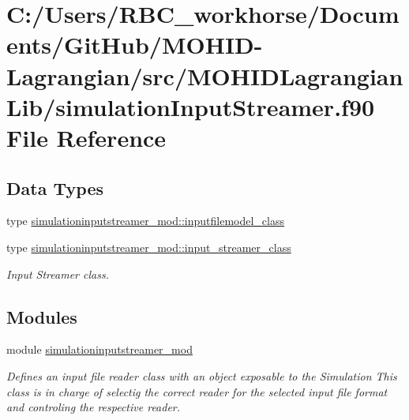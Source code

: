 \hypertarget{simulation_input_streamer_8f90}{}\section{C\+:/\+Users/\+R\+B\+C\+\_\+workhorse/\+Documents/\+Git\+Hub/\+M\+O\+H\+I\+D-\/\+Lagrangian/src/\+M\+O\+H\+I\+D\+Lagrangian\+Lib/simulation\+Input\+Streamer.f90 File Reference}
\label{simulation_input_streamer_8f90}
\subsection*{Data Types}
\begin{DoxyCompactItemize}
\item 
type \mbox{\hyperlink{structsimulationinputstreamer__mod_1_1inputfilemodel__class}{simulationinputstreamer\+\_\+mod\+::inputfilemodel\+\_\+class}}
\item 
type \mbox{\hyperlink{structsimulationinputstreamer__mod_1_1input__streamer__class}{simulationinputstreamer\+\_\+mod\+::input\+\_\+streamer\+\_\+class}}
\begin{DoxyCompactList}\small\item\em Input Streamer class. \end{DoxyCompactList}\end{DoxyCompactItemize}
\subsection*{Modules}
\begin{DoxyCompactItemize}
\item 
module \mbox{\hyperlink{namespacesimulationinputstreamer__mod}{simulationinputstreamer\+\_\+mod}}
\begin{DoxyCompactList}\small\item\em Defines an input file reader class with an object exposable to the Simulation This class is in charge of selectig the correct reader for the selected input file format and controling the respective reader. \end{DoxyCompactList}\end{DoxyCompactItemize}
